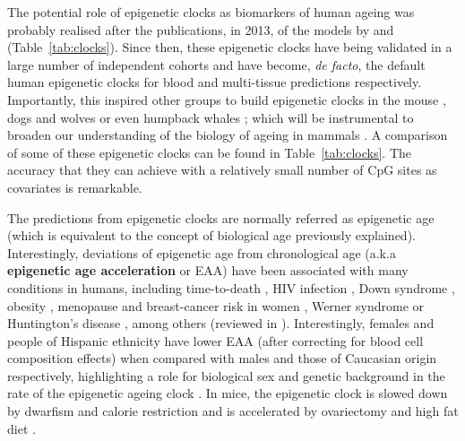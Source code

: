 \bigskip

The potential role of epigenetic clocks as biomarkers of human ageing was probably realised after the publications, in 2013, of the models by \citet{Hannum2013} and \citet{Horvath2013} (Table~\ref{tab:clocks}). Since then, these epigenetic clocks have being validated in a large number of independent cohorts and have become, \textit{de facto}, the default human epigenetic clocks for blood and multi-tissue predictions respectively. Importantly, this inspired other groups to build epigenetic clocks in the mouse \citep{Wang2017,Stubbs2017,Petkovich2017,Thompson2018,Meer2018}, dogs and wolves \citep{Thompson2017} or even humpback whales \citep{Polanowski2014}; which will be instrumental to broaden our understanding of the biology of ageing in mammals \citep{Stubbs2017}. A comparison of some of these epigenetic clocks can be found in Table~\ref{tab:clocks}. The accuracy that they can achieve with a relatively small number of CpG sites as covariates is remarkable.

\bigskip

The predictions from epigenetic clocks are normally referred as epigenetic age (which is equivalent to the concept of biological age previously explained). Interestingly, deviations of epigenetic age from chronological age (a.k.a \textbf{epigenetic age acceleration} or \acrshort{EAA}) have been associated with many conditions in humans, including time-to-death \citep{Chen2016,Marioni2015}, HIV infection \citep{Horvath2015b}, Down syndrome \citep{Horvath2015a}, obesity \citep{Horvath2014}, menopause \citep{Levine2016} and breast-cancer risk in women \citep{Kresovich2019}, Werner syndrome \citep{Maierhofer2017} or Huntington’s disease \citep{Horvath2016a}, among others (reviewed in \citet{Horvath2018}). Interestingly, females and people of Hispanic ethnicity have lower \acrshort{EAA} (after correcting for blood cell composition effects) when compared with males and those of Caucasian origin respectively, highlighting a role for biological sex and genetic background in the rate of the epigenetic ageing clock \citep{Horvath2016}. In mice, the epigenetic clock is slowed down by dwarfism and calorie restriction \citep{Wang2017,Cole2017,Petkovich2017,Thompson2018,Meer2018} and is accelerated by ovariectomy and high fat diet \citep{Wang2017,Stubbs2017, Petkovich2017,Thompson2018}. 

\bigskip

